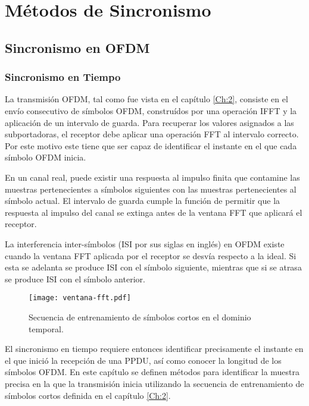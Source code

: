 \chapter{Métodos de Sincronismo}
\label{Ch:3}
\graphicspath{{figs/}}
\section{Sincronismo en OFDM}
\label{S:ch3-sincronismo}

\subsection{Sincronismo en Tiempo}
\label{Ss:ch3-sincronismo-tiempo}

La transmisión OFDM, tal como fue vista en el capítulo \ref{Ch:2}, consiste en el envío consecutivo de símbolos OFDM, construídos por una operación IFFT y la aplicación de un intervalo de guarda. Para recuperar los valores asignados a las subportadoras, el receptor debe aplicar una operación FFT al intervalo correcto. Por este motivo este tiene que ser capaz de identificar el instante en el que cada símbolo OFDM inicia.

En un canal real, puede existir una respuesta al impulso finita que contamine las muestras pertenecientes a símbolos siguientes con las muestras pertenecientes al símbolo actual. El intervalo de guarda cumple la función de permitir que la respuesta al impulso del canal se extinga antes de la ventana FFT que aplicará el receptor.

La interferencia inter-símbolos (ISI por sus siglas en inglés) en OFDM existe cuando la ventana FFT aplicada por el receptor se desvía respecto a la ideal. Si esta se adelanta se produce ISI con el símbolo siguiente, mientras que si se atrasa se produce ISI con el símbolo anterior.\\
\begin{figure}[ht]
    \centering{}\texttt{[image: ventana-fft.pdf]}
    \caption{Secuencia de entrenamiento de símbolos cortos en el dominio temporal.\label{fig:ventana-fft}}  
\end{figure}

El sincronismo en tiempo requiere entonces identificar precisamente el instante en el que inició la recepción de una PPDU, así como conocer la longitud de los símbolos OFDM. En este capítulo se definen métodos para identificar la muestra precisa en la que la transmisión inicia utilizando la secuencia de entrenamiento de símbolos cortos definida en el capítulo \ref{Ch:2}.

